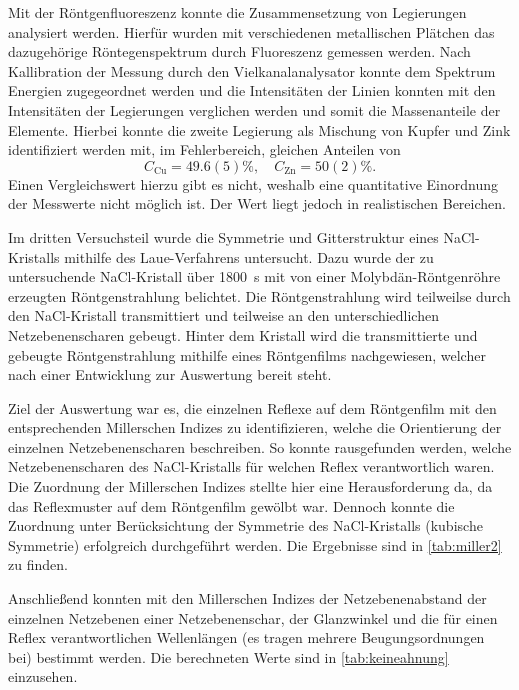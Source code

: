 Mit der Röntgenfluoreszenz konnte die Zusammensetzung von 
Legierungen analysiert werden. Hierfür wurden mit verschiedenen metallischen Plätchen 
das dazugehörige Röntegenspektrum durch Fluoreszenz gemessen werden. Nach Kallibration
der Messung durch den Vielkanalanalysator konnte dem Spektrum Energien zugegeordnet werden und die 
Intensitäten der Linien konnten mit den Intensitäten der Legierungen verglichen werden und somit
die Massenanteile der Elemente. Hierbei konnte die zweite Legierung als 
Mischung von Kupfer und Zink identifiziert werden mit, im Fehlerbereich, gleichen Anteilen von 
\begin{equation*}
    C_\mathrm{Cu} = 49.6(5)\%,\quad C_\mathrm{Zn} = 50(2)\%.
\end{equation*}
Einen Vergleichswert hierzu gibt es nicht, weshalb eine quantitative Einordnung der Messwerte 
nicht möglich ist. Der Wert liegt jedoch in realistischen Bereichen.
\\\par

Im dritten Versuchsteil wurde die Symmetrie und Gitterstruktur eines NaCl-Kristalls mithilfe des Laue-Verfahrens
untersucht. Dazu wurde der zu untersuchende NaCl-Kristall über \SI{1800}{\second} mit von einer
Molybdän-Röntgenröhre erzeugten Röntgenstrahlung belichtet. Die Röntgenstrahlung wird teilweilse durch den
NaCl-Kristall transmittiert und teilweise an den unterschiedlichen Netzebenenscharen gebeugt. Hinter dem Kristall
wird die transmittierte und gebeugte Röntgenstrahlung mithilfe eines Röntgenfilms nachgewiesen, welcher nach
einer Entwicklung zur Auswertung bereit steht.\par
Ziel der Auswertung war es, die einzelnen Reflexe auf dem Röntgenfilm mit den entsprechenden Millerschen Indizes
zu identifizieren, welche die Orientierung der einzelnen Netzebenenscharen beschreiben. So konnte rausgefunden werden,
welche Netzebenenscharen des NaCl-Kristalls für welchen Reflex verantwortlich waren. Die Zuordnung der Millerschen
Indizes stellte hier eine Herausforderung da, da das Reflexmuster auf dem Röntgenfilm gewölbt war. Dennoch konnte
die Zuordnung unter Berücksichtung der Symmetrie des NaCl-Kristalls (kubische Symmetrie) erfolgreich durchgeführt werden.
Die Ergebnisse sind in \cref{tab:miller2} zu finden.\par
Anschließend konnten mit den Millerschen Indizes der Netzebenenabstand der einzelnen Netzebenen einer Netzebenenschar,
der Glanzwinkel und die für einen Reflex verantwortlichen Wellenlängen (es tragen mehrere Beugungsordnungen bei)
bestimmt werden. Die berechneten Werte sind in \cref{tab:keineahnung} einzusehen.